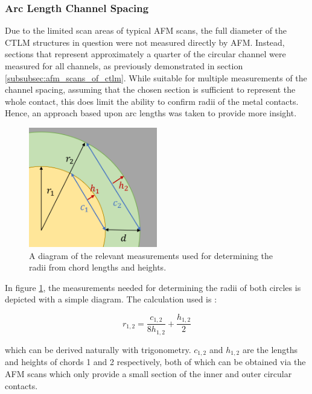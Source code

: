 \begin{refsection}
\subsubsection{Arc Length Channel Spacing}
Due to the limited scan areas of typical AFM scans, the full diameter of the CTLM structures in question were not measured directly by AFM. Instead, sections that represent approximately a quarter of the circular channel were measured for all channels, as previously demonstrated in section \ref{subsubsec:afm_scans_of_ctlm}. While suitable for multiple measurements of the channel spacing, assuming that the chosen section is sufficient to represent the whole contact, this does limit the ability to confirm radii of the metal contacts. Hence, an approach based upon arc lengths was taken to provide more insight. 

\begin{figure}[h]
    \centering
    \includegraphics[width=0.5\textwidth]{Chapter3/Figs/Raster/chords_ctlm.png}
    \caption{A diagram of the relevant measurements used for determining the radii from chord lengths and heights.}
    \label{fig:chords_afm}
\end{figure}

In figure \ref{fig:chords_afm}, the measurements needed for determining the radii of both circles is depicted with a simple diagram. The calculation used is \cite{ybc7289}:

\begin{equation}
    r_{1,2} = \frac{c_{1,2}}{8h_{1,2}} + \frac{h_{1,2}}{2}
    \label{eq:chords_arc_length}
\end{equation}

which can be derived naturally with trigonometry. $c_{1,2}$ and $h_{1,2}$ are the lengths and heights of chords 1 and 2 respectively, both of which can be obtained via the AFM scans which only provide a small section of the inner and outer circular contacts.


\end{refsection}
